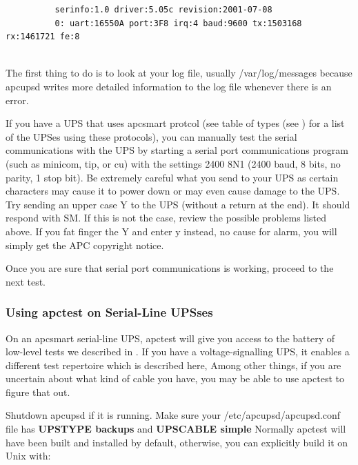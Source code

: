 {{{{{{{{{{\begin{itemize}
\begin{verbatim}
          serinfo:1.0 driver:5.05c revision:2001-07-08
          0: uart:16550A port:3F8 irq:4 baud:9600 tx:1503168 rx:1461721 fe:8
     
\end{verbatim}
\normalsize

\end{itemize}

The first thing to do is to look at your log file, usually /var/log/messages
because apcupsd writes more detailed information to the log file whenever
there is an error.  

If you have a UPS that uses apcsmart protcol (see table of types (see 
) for a list of the UPSes using
these protocols), you can manually test the serial communications with the UPS
by starting a serial port communications program (such as minicom, tip, or cu)
with the settings 2400 8N1 (2400 baud, 8 bits, no parity, 1 stop bit). Be
extremely careful what you send to your UPS as certain characters may cause it
to power down or may even cause damage to the UPS. Try sending an upper case Y
to the UPS (without a return at the end). It should respond with SM. If this
is not the case, review the possible problems listed above. If you fat finger
the Y and enter y instead, no cause for alarm, you will simply get the APC
copyright notice.  

Once you are sure that serial port communications is working, proceed to the
next test. 

\label{Using-apctest-on-Serial_002dLine-UPSses}

\subsubsection*{Using apctest on Serial-Line UPSses}

\label{index-apctest-222}
\label{index-Testing_002c-with-apctest-223}
On an apcsmart serial-line UPS, apctest will give you access to the battery of
low-level tests we described in 
.  If you have a voltage-signalling UPS, it
enables a different test repertoire which is described here, Among other
things, if you are uncertain about what kind of cable you have, you may be
able to use apctest to figure that out.  

Shutdown apcupsd if it is running. Make sure your /etc/apcupsd/apcupsd.conf
file has {\bf UPSTYPE backups} and {\bf UPSCABLE simple} Normally apctest will
have been built and installed by default, otherwise, you can explicitly build
it on Unix with: 

}}}}}}}}}}
